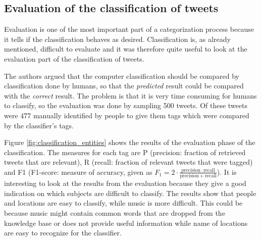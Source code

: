 
\subsection{Evaluation of the classification of tweets}
Evaluation is one of the most important part of a categorization process because it tells if the classification behaves as desired. Classification is, as already mentioned, difficult to evaluate and it was therefore quite useful to look at the evaluation part of the classification of tweets.

The authors argued that the computer classification should be compared by classification done by humans, so that the \textit{predicted} result could be compared with the \textit{correct} result. The problem is that it is very time consuming for humans to classify, so the evaluation was done by sampling 500 tweets. Of these tweets were 477 manually identified by people to give them tags which were compared by the classifier's tags. 

Figure \ref{fig:classification_entities} shows the results of the evaluation phase of the classification. The measures for each tag are P (precision: fraction of retrieved tweets that are relevant), R (recall: fraction of relevant tweets that were tagged) and F1 (F1-score: measure of accuracy, given as $ F_1 = 2 \cdot \frac{\mathrm{precision} \cdot \mathrm{recall}}{\mathrm{precision} + \mathrm{recall}}$). It is interesting to look at the results from the evaluation because they give a good indication on which subjects are difficult to classify. The results show that people and locations are easy to classify, while music is more difficult. This could be because music might contain common words that are dropped from the knowledge base or does not provide useful information while name of locations are easy to recognize for the classifier. 



